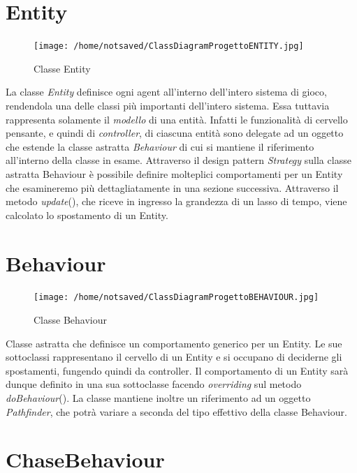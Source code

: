 \documentclass[11pt]{book}
\begin{document}
\section{Entity}

\begin{figure}[H]
\centering
\texttt{[image: /home/notsaved/ClassDiagramProgettoENTITY.jpg]}
\caption{Classe Entity}
\label{classentity}
\end{figure}

La classe \emph{Entity} definisce ogni agent all'interno dell'intero sistema di gioco, rendendola una delle classi pi\`u importanti dell'intero sistema. Essa tuttavia rappresenta solamente il \emph{modello} di una entit\`a. Infatti le funzionalit\`a di cervello pensante, e quindi di \emph{controller}, di ciascuna entit\`a sono delegate ad un oggetto che estende la classe astratta \emph{Behaviour} di cui si mantiene il riferimento all'interno della classe in esame. Attraverso il design pattern \emph{Strategy} sulla classe astratta Behaviour \`e possibile definire molteplici comportamenti per un Entity che esamineremo pi\`u dettagliatamente in una sezione successiva. Attraverso il metodo \emph{update}(), che riceve in ingresso la grandezza di un lasso di tempo, viene calcolato lo spostamento di un Entity.

\section{Behaviour}

\begin{figure}[H]
\centering
\texttt{[image: /home/notsaved/ClassDiagramProgettoBEHAVIOUR.jpg]}
\caption{Classe Behaviour}
\label{classbehaviour}
\end{figure}

Classe astratta che definisce un comportamento generico per un Entity. Le sue sottoclassi rappresentano il cervello di un Entity e si occupano di deciderne gli spostamenti, fungendo quindi da controller. Il comportamento di un Entity sar\`a dunque definito in una sua sottoclasse facendo \emph{overriding} sul metodo \emph{doBehaviour}(). La classe mantiene inoltre un riferimento ad un oggetto \emph{Pathfinder}, che potr\`a variare a seconda del tipo effettivo della classe Behaviour.

\section{ChaseBehaviour}
\end{document}
